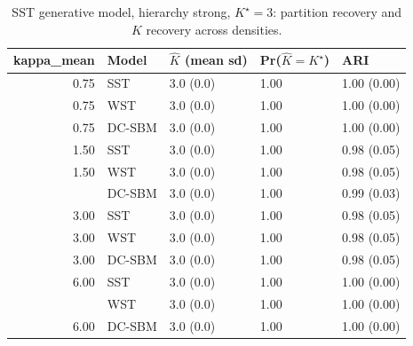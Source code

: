 \begin{table}
\centering
\caption{SST generative model, hierarchy strong, $K^\star=3$: partition recovery and $K$ recovery across densities.}
\centering
\begin{tabular}[t]{rllll}
\toprule
kappa_mean & Model & $\hat K$ (mean sd) & Pr($\hat K = K^\star$) & ARI\\
\midrule
0.75 & SST & 3.0 (0.0) & 1.00 & 1.00 (0.00)\\
0.75 & WST & 3.0 (0.0) & 1.00 & 1.00 (0.00)\\
0.75 & DC-SBM & 3.0 (0.0) & 1.00 & 1.00 (0.00)\\
1.50 & SST & 3.0 (0.0) & 1.00 & 0.98 (0.05)\\
1.50 & WST & 3.0 (0.0) & 1.00 & 0.98 (0.05)\\
\addlinespace
1.50 & DC-SBM & 3.0 (0.0) & 1.00 & 0.99 (0.03)\\
3.00 & SST & 3.0 (0.0) & 1.00 & 0.98 (0.05)\\
3.00 & WST & 3.0 (0.0) & 1.00 & 0.98 (0.05)\\
3.00 & DC-SBM & 3.0 (0.0) & 1.00 & 0.98 (0.05)\\
6.00 & SST & 3.0 (0.0) & 1.00 & 1.00 (0.00)\\
\addlinespace
6.00 & WST & 3.0 (0.0) & 1.00 & 1.00 (0.00)\\
6.00 & DC-SBM & 3.0 (0.0) & 1.00 & 1.00 (0.00)\\
\bottomrule
\end{tabular}
\end{table}
